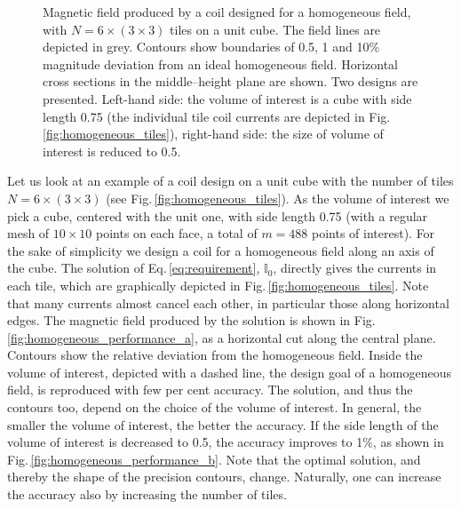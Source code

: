 \begin{figure}[bth]
  \centering
  \quad
  \caption{Magnetic field produced by a coil designed for a homogeneous field, with $N = 6 \times (3 \times 3)$ tiles on a unit cube. The field lines are depicted in grey. Contours show boundaries of 0.5, 1 and 10\% magnitude deviation from an ideal homogeneous field. Horizontal cross sections in the middle--height plane are shown. Two designs are presented. Left-hand side: the volume of interest is a cube with side length 0.75 (the individual tile coil currents are depicted in Fig.\,\ref{fig:homogeneous_tiles}), right-hand side: the size of volume of interest is reduced to 0.5.}
  \label{fig:homogeneous_performance}
\end{figure}

Let us look at an example of a coil design on a unit cube with the number of tiles $N = 6 \times (3 \times 3)$ (see Fig.\,\ref{fig:homogeneous_tiles}). As the volume of interest we pick a cube, centered with the unit one, with side length 0.75 (with a regular mesh of $10 \times 10$ points on each face, a total of $m = 488$ points of interest). For the sake of simplicity we design a coil for a homogeneous field along an axis of the cube. The solution of Eq.\,\ref{eq:requirement}, $\mathbb{I}_0$, directly gives the currents in each tile, which are graphically depicted in Fig.\,\ref{fig:homogeneous_tiles}. Note that many currents almost cancel each other, in particular those along horizontal edges. The magnetic field produced by the solution is shown in Fig.\,\ref{fig:homogeneous_performance_a}, as a horizontal cut along the central plane. Contours show the relative deviation from the homogeneous field. Inside the volume of interest, depicted with a dashed line, the design goal of a homogeneous field, is reproduced with few per cent accuracy. The solution, and thus the contours too, depend on the choice of the volume of interest. In general, the smaller the volume of interest, the better the accuracy. If the side length of the volume of interest is decreased to 0.5, the accuracy improves to 1\%, as shown in Fig.\,\ref{fig:homogeneous_performance_b}. Note that the optimal solution, and thereby the shape of the precision contours, change. Naturally, one can increase the accuracy also by increasing the number of tiles.

